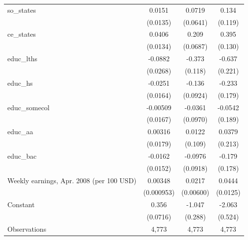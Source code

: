 \begin{table}[htbp]
\begin{tabular}{l*{3}{c}}
\addlinespace
so\_states           &      0.0151         &      0.0719         &       0.134         \\
                    &    (0.0135)         &    (0.0641)         &     (0.119)         \\
\addlinespace
ce\_states           &      0.0406\sym{***}&       0.209\sym{***}&       0.395\sym{***}\\
                    &    (0.0134)         &    (0.0687)         &     (0.130)         \\
\addlinespace
educ\_lths           &     -0.0882\sym{***}&      -0.373\sym{***}&      -0.637\sym{***}\\
                    &    (0.0268)         &     (0.118)         &     (0.221)         \\
\addlinespace
educ\_hs             &     -0.0251         &      -0.136         &      -0.233         \\
                    &    (0.0164)         &    (0.0924)         &     (0.179)         \\
\addlinespace
educ\_somecol        &    -0.00509         &     -0.0361         &     -0.0542         \\
                    &    (0.0167)         &    (0.0970)         &     (0.189)         \\
\addlinespace
educ\_aa             &     0.00316         &      0.0122         &      0.0379         \\
                    &    (0.0179)         &     (0.109)         &     (0.213)         \\
\addlinespace
educ\_bac            &     -0.0162         &     -0.0976         &      -0.179         \\
                    &    (0.0152)         &    (0.0918)         &     (0.178)         \\
\addlinespace
Weekly earnings, Apr. 2008 (per 100 USD)&     0.00348\sym{***}&      0.0217\sym{***}&      0.0444\sym{***}\\
                    &  (0.000953)         &   (0.00600)         &    (0.0125)         \\
\addlinespace
Constant            &       0.356\sym{***}&      -1.047\sym{***}&      -2.063\sym{***}\\
                    &    (0.0716)         &     (0.288)         &     (0.524)         \\
\midrule
Observations        &       4,773         &       4,773         &       4,773         \\

\end{tabular}
\end{table}
